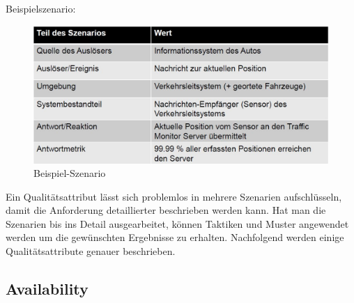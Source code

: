 Beispielszenario:
\begin{figure}[h!]
\centering
\includegraphics[width=0.7\linewidth]{fig/sample-scenario}
\caption{Beispiel-Szenario}
\label{fig:sample-scenario}
\end{figure}


Ein Qualitätsattribut lässt sich problemlos in mehrere Szenarien aufschlüsseln, damit die Anforderung detaillierter beschrieben werden kann. Hat man die Szenarien bis ins Detail ausgearbeitet, können Taktiken und Muster angewendet werden um die gewünschten Ergebnisse zu erhalten.
Nachfolgend werden einige Qualitätsattribute genauer beschrieben.

\subsection{Availability}

